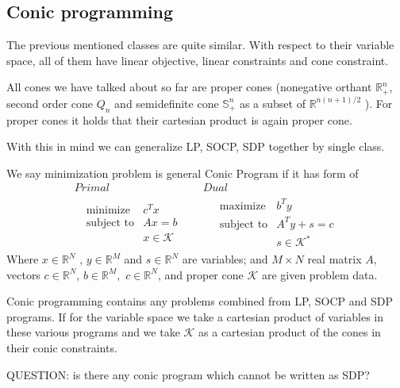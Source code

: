 \documentclass[10pt,oneside]{book}
\theoremstyle{definition}
\begin{document}
\subsection{Conic programming}

The previous mentioned classes are quite similar. 
With respect to their variable space, all of them have linear objective, linear constraints and cone constraint.

All cones we have talked about so far are proper cones (nonegative orthant $\mathbb{R}^n_+$, second order cone $Q_n$ and semidefinite cone $\mathbb{S}^n_+$ as a subset of $ \mathbb{R}^{n(n+1)/2}$ ).
For proper cones it holds that their cartesian product is again proper cone. 

With this in mind we can generalize LP, SOCP, SDP together by single class.


\label{defConeProg}
We say minimization problem is general Conic Program if it has form of
\begin{equation}
\label{coneProg} 
\begin{array}{c|c}
Primal & Dual \\
\ \ \ \begin{array}{ll}
\mbox{minimize} & c^Tx\\
\mbox{subject to}& Ax = b\\
& x \in \mathcal{K}
\end{array} 
 \ \ \ \ \ & \ \ \ \ \ 
 \begin{array}{ll}
\mbox{maximize} & b^Ty\\
\mbox{subject to}& A^Ty + s = c\\
& s \in \mathcal{K}^*
\end{array}
\end{array}
\tag{Conic Program}
\end{equation}
Where $x\in \mathbb{R}^N$ , $y\in \mathbb{R}^M$ and $s\in \mathbb{R}^N$ are variables; and $M\times N$ real matrix $A$, vectors $c\in \mathbb{R}^N$, $b\in \mathbb{R}^{M},$ $c\in \mathbb{R}^N$, and proper cone $\mathcal{K}$ are given problem data. 

Conic programming contains any problems combined from LP, SOCP and SDP programs. If for the variable space we take a cartesian product of variables in these various programs and we take $\mathcal{K}$ as a cartesian product of the cones in their conic constraints.

QUESTION: is there any conic program which cannot be written as SDP?
\end{document}
